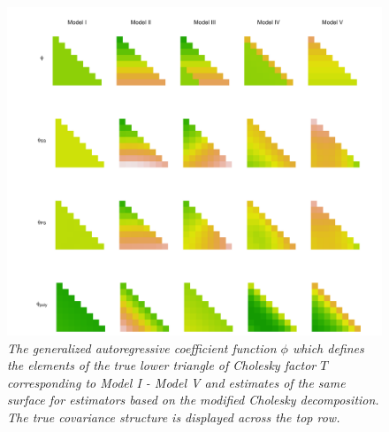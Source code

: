 \begin{figure}[H] 
\centering
  \includegraphics[width = \textwidth]{img/chapter-4/cholesky-estimate-lattice}
  \vspace*{3mm}
  \caption{\textit{The generalized autoregressive coefficient function $\phi$ which defines the elements of the true lower triangle of Cholesky factor $T$ corresponding to Model I - Model V and estimates of the same surface for estimators based on the modified Cholesky decomposition. The true covariance structure is displayed across the top row.}}  \label{fig:chol-estimate-lattice}
\end{figure}

%

